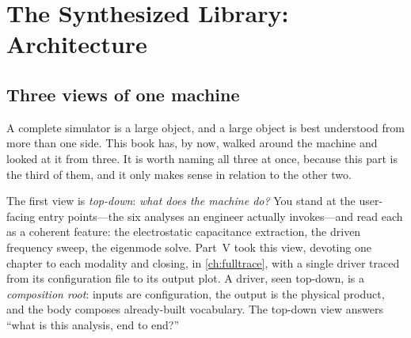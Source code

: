 \chapter{The Synthesized Library: Architecture}
\label{ch:synthlib}


\section{Three views of one machine}
\label{sec:threeviews}

A complete simulator is a large object, and a large object is best understood from
more than one side. This book has, by now, walked around the machine and looked at
it from three. It is worth naming all three at once, because this part is the
third of them, and it only makes sense in relation to the other two.

The first view is \emph{top-down}: \emph{what does the machine do?} You stand at
the user-facing entry points---the six analyses an engineer actually invokes---and
read each as a coherent feature: the electrostatic capacitance extraction, the
driven frequency sweep, the eigenmode solve. Part~V took this view, devoting one
chapter to each modality and closing, in \cref{ch:fulltrace}, with a single driver
traced from its configuration file to its output plot. A driver, seen top-down, is
a \emph{composition root}: inputs are configuration, the output is the physical
product, and the body composes already-built vocabulary. The top-down view answers
``what is this analysis, end to end?''

